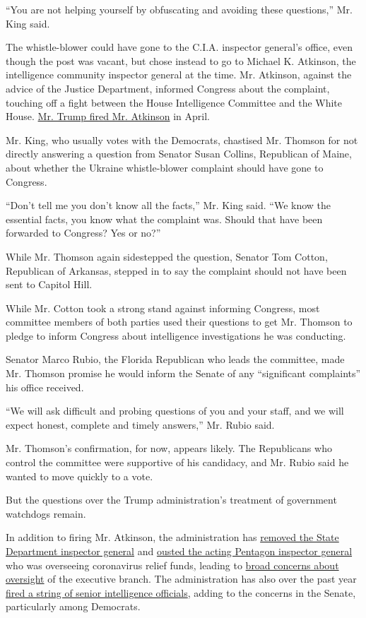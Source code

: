 ``You are not helping yourself by obfuscating and avoiding these
questions,'' Mr. King said.

The whistle-blower could have gone to the C.I.A. inspector general's
office, even though the post was vacant, but chose instead to go to
Michael K. Atkinson, the intelligence community inspector general at the
time. Mr. Atkinson, against the advice of the Justice Department,
informed Congress about the complaint, touching off a fight between the
House Intelligence Committee and the White House.
\href{https://www.nytimes.com/2020/04/03/us/trump-inspector-general-intelligence-fired.html}{Mr.
Trump fired Mr. Atkinson} in April.

Mr. King, who usually votes with the Democrats, chastised Mr. Thomson
for not directly answering a question from Senator Susan Collins,
Republican of Maine, about whether the Ukraine whistle-blower complaint
should have gone to Congress.

``Don't tell me you don't know all the facts,'' Mr. King said. ``We know
the essential facts, you know what the complaint was. Should that have
been forwarded to Congress? Yes or no?''

While Mr. Thomson again sidestepped the question, Senator Tom Cotton,
Republican of Arkansas, stepped in to say the complaint should not have
been sent to Capitol Hill.

While Mr. Cotton took a strong stand against informing Congress, most
committee members of both parties used their questions to get Mr.
Thomson to pledge to inform Congress about intelligence investigations
he was conducting.

Senator Marco Rubio, the Florida Republican who leads the committee,
made Mr. Thomson promise he would inform the Senate of any ``significant
complaints'' his office received.

``We will ask difficult and probing questions of you and your staff, and
we will expect honest, complete and timely answers,'' Mr. Rubio said.

Mr. Thomson's confirmation, for now, appears likely. The Republicans who
control the committee were supportive of his candidacy, and Mr. Rubio
said he wanted to move quickly to a vote.

But the questions over the Trump administration's treatment of
government watchdogs remain.

In addition to firing Mr. Atkinson, the administration has
\href{https://www.nytimes.com/2020/05/16/us/politics/trump-state-dept-inspector-general.html}{removed
the State Department inspector general} and
\href{https://www.nytimes.com/2020/05/26/us/politics/pentagon-inspector-general-glenn-fine.html}{ousted
the acting Pentagon inspector general} who was overseeing coronavirus
relief
funds\href{https://www.nytimes.com/2020/05/22/us/politics/trump-inspectors-general.html}{,}
leading to
\href{https://www.nytimes.com/2020/05/22/us/politics/trump-inspectors-general.html}{broad
concerns about oversight} of the executive branch. The administration
has also over the past year
\href{https://www.nytimes.com/2020/02/19/us/politics/dni-national-intelligence-director-grenell.html}{fired
a string of senior intelligence officials}, adding to the concerns in
the Senate, particularly among Democrats.


